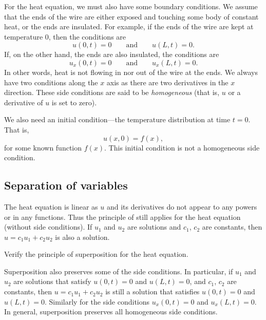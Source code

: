 \documentclass[12pt]{book}
\begin{document}
For the heat equation, we must also have some
boundary conditions.
We assume that the ends of the wire are either exposed 
and touching some body of constant heat, or the ends are insulated.
For example, if the ends of the wire are kept at temperature 0, then
the conditions are
\begin{equation*}
u(0,t) = 0 \qquad \text{and} \qquad u(L,t) = 0.
\end{equation*}
If, on the other hand, the ends are also insulated, the conditions are
\begin{equation*}
u_x(0,t) = 0 \qquad \text{and} \qquad
u_x(L,t) = 0 .
\end{equation*}
In other words, heat is not flowing in nor out of the wire at the ends.
We always have two conditions along the $x$ axis as there are
two derivatives in the $x$ direction.
These side conditions are said to be
\emph{homogeneous}
(that is, $u$ or a derivative of $u$ is set to zero).

We also need an initial condition---the temperature distribution
at time $t=0$.  That is,
\begin{equation*}
u(x,0) = f(x) ,
\end{equation*}
for some known function $f(x)$.
This initial condition is not a homogeneous side condition.

\subsection{Separation of variables}

The heat equation is linear as $u$ and its derivatives do not
appear to any powers or in any functions.
Thus the principle of  still applies for
the heat equation
(without side conditions).
If $u_1$ and $u_2$ are
solutions and $c_1$, $c_2$ are constants, then
$u = c_1 u_1 + c_2 u_2$ is also a solution.

\begin{exercise}
Verify the principle of superposition for the heat equation.
\end{exercise}

Superposition also preserves some of the side conditions.  In particular,
if $u_1$ and $u_2$ are
solutions that satisfy $u(0,t) = 0$ and $u(L,t) = 0$,
and $c_1$, $c_2$ are constants, then
$u = c_1 u_1 + c_2 u_2$ is still a solution
that satisfies $u(0,t) = 0$ and $u(L,t) = 0$.  Similarly
for the side conditions $u_x(0,t) = 0$ and $u_x(L,t) = 0$.  In general,
superposition preserves all homogeneous side conditions.
\end{document}

